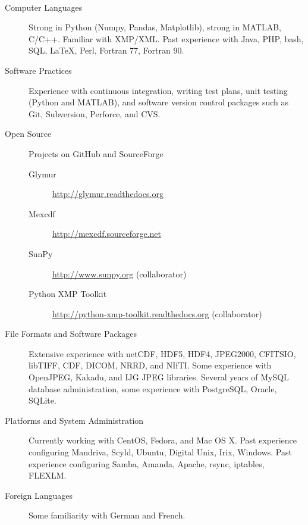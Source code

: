 \documentclass[11pt]{article}  %
\begin{document}
\bigskip
{}\\ 
\begin{description}
  \item[Computer Languages]Strong in Python (Numpy, Pandas, Matplotlib), strong
    in MATLAB, C/C++.  Familiar with XMP/XML.  Past experience with Java, PHP,
    bash, SQL, \LaTeX, Perl, Fortran 77, Fortran 90.
  \item[Software Practices]Experience with continuous integration, writing
    test plans, unit testing (Python and MATLAB), and software version control
    packages such as Git, Subversion, Perforce, and CVS.
  \item[Open Source]Projects on GitHub and SourceForge
    \begin{description}
      \item[Glymur]\url{http://glymur.readthedocs.org}
      \item[Mexcdf]\url{http://mexcdf.sourceforge.net}
      \item[SunPy]\url{http://www.sunpy.org} (collaborator)
      \item[Python XMP Toolkit]\url{http://python-xmp-toolkit.readthedocs.org}
        (collaborator)
    \end{description}
  \item[File Formats and Software Packages]Extensive experience with netCDF,
    HDF5, HDF4, JPEG2000, CFITSIO, libTIFF, CDF, DICOM, NRRD, and
    NIfTI.  Some experience with OpenJPEG, Kakadu, and IJG JPEG
    libraries.  Several years of MySQL database administration,
    some experience with PostgreSQL, Oracle, SQLite.
  \item[Platforms and System Administration]Currently working with CentOS,
    Fedora, and Mac OS X.  Past experience configuring Mandriva, Scyld, Ubuntu,
    Digital Unix, Irix, Windows.  Past experience configuring Samba, Amanda,
    Apache, rsync, iptables, FLEXLM.
  \item[Foreign Languages]Some familiarity with German and French.
\end{description}
\end{document}
